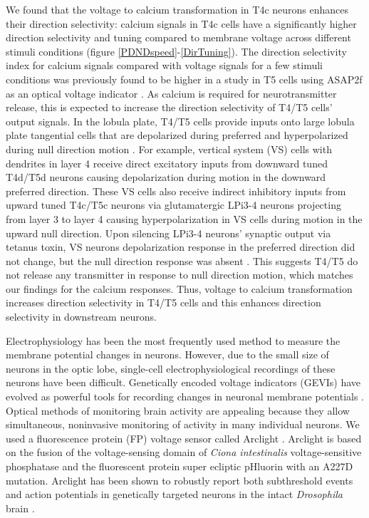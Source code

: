 \documentclass[9pt,lineno]{elife}
\begin{document}
We found that the voltage to calcium transformation in T4c neurons enhances their direction selectivity: calcium signals in T4c cells have a significantly higher direction selectivity and tuning compared to membrane voltage across different stimuli conditions (figure \ref{PDNDspeed}-\ref{DirTuning}). The direction selectivity index for calcium signals compared with voltage signals for a few stimuli conditions was previously found to be higher in a study in T5 cells using ASAP2f as an optical voltage indicator \parencite{Wienecke2018}. As calcium is required for neurotransmitter release, this is expected to increase the direction selectivity of T4/T5 cells' output signals. In the lobula plate, T4/T5 cells provide inputs onto large lobula plate tangential cells that are depolarized during preferred and hyperpolarized during null direction motion \parencite{Mauss2014}. For example, vertical system (VS) cells with dendrites in layer 4 receive direct excitatory inputs from downward tuned T4d/T5d neurons causing depolarization during motion in the downward preferred direction. These VS cells also receive indirect inhibitory inputs from upward tuned T4c/T5c neurons via glutamatergic LPi3-4 neurons projecting from layer 3 to layer 4 causing hyperpolarization in VS cells during motion in the upward null direction. Upon silencing LPi3-4 neurons’ synaptic output via tetanus toxin, VS neurons depolarization response in the preferred direction did not change, but the null direction response was absent \parencite{Mauss2015}. This suggests T4/T5 do not release any transmitter in response to null direction motion, which matches our findings for the calcium responses. Thus, voltage to calcium transformation increases direction selectivity in T4/T5 cells and this enhances direction selectivity in downstream neurons. 


Electrophysiology has been the most frequently used method to measure the membrane potential changes in neurons. However, due to the small size of neurons in the optic lobe, single-cell electrophysiological recordings of these neurons have been difficult. Genetically encoded voltage indicators (GEVIs) have evolved as powerful tools for recording changes in neuronal membrane potentials \parencite{Yang2016}. Optical methods of monitoring brain activity are appealing because they allow simultaneous, noninvasive monitoring of activity in many individual neurons. We used a fluorescence protein (FP) voltage sensor called Arclight \parencite{Jin2012}. Arclight is based on the fusion of the voltage-sensing domain of \textit{Ciona intestinalis} voltage-sensitive phosphatase \parencite{Murata2005} and the fluorescent protein super ecliptic pHluorin with an A227D mutation. Arclight has been shown to robustly report both subthreshold events and action potentials in genetically targeted neurons in the intact \textit{Drosophila} brain \parencite{Cao2013}. 
\end{document}
